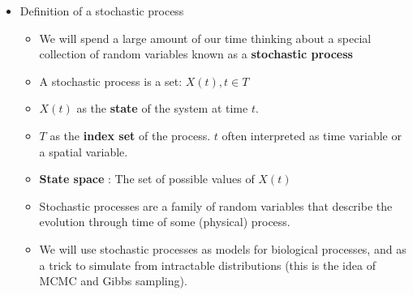 \documentclass[10pt,containsverbatim,paralist]{article}
\begin{document}
\begin{itemize}
\begin{itemize}
\begin{itemize}
\end{itemize}
\end{itemize}
\item Definition of a stochastic process
\label{sec-1-1-4-5}
\begin{itemize}
\item We will spend a large amount of our time thinking about a special collection
of random variables known as a \textbf{stochastic process}
\item A stochastic process is a set: ${X(t),t\in T}$
\item $X(t)$ as the \textbf{state} of the system at time $t$.
\item $T$ as the \textbf{index set} of the process. $t$ often interpreted as time variable or
a spatial variable.
\item \textbf{State space} : The set of possible values of $X(t)$
\item Stochastic processes are a family of random variables that describe the evolution
through time of some (physical) process.
\item We will use stochastic processes as models for biological processes, and as a
trick to simulate from intractable distributions (this is the idea of MCMC and Gibbs sampling).
\end{itemize}
\end{itemize}
\end{document}
